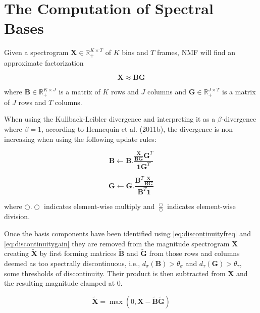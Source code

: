 \documentclass[10pt]{article}
\begin{document}
\section*{The Computation of Spectral Bases}
Given a spectrogram \( \mathbf{X} \in \mathbb{R}_{+}^{K \times T}\) of \( K \) bins and \( T \) frames, NMF
will find an approximate factorization

\[ \mathbf{X} \approx \mathbf{B}\mathbf{G} \]

\noindent
where \( \mathbf{B} \in \mathbb{R}_{+}^{K \times J}\) is a matrix of \( K \)
rows and \( J \) columns and \( \mathbf{G} \in \mathbb{R}_{+}^{J \times T}\) is
a matrix of \( J \) rows and \( T \) columns.
\par
When using the Kullback-Leibler divergence and interpreting it as a
\(\beta\)-divergence where \(\beta = 1 \), according to Hennequin et al.
(2011b), the divergence is non-increasing when using the following update rules:

\[ \mathbf{B} \gets
\mathbf{B}.\frac{\frac{\mathbf{X}}{\mathbf{B}\mathbf{G}}\mathbf{G}^T}
    {\mathbf{1}\mathbf{G}^T}
\]

\[ \mathbf{G} \gets
\mathbf{G}.\frac{\mathbf{B}^T\frac{\mathbf{X}}{\mathbf{B}\mathbf{G}}}
    {\mathbf{B}^{T}\mathbf{1}}
\]

\noindent
where \( \bigcirc.\bigcirc \) indicates element-wise multiply and \( \frac{\bigcirc}{\bigcirc} \) indicates
element-wise division.
\par
Once the basis components have been identified using
\eqref{eq:discontinuityfreq} and \eqref{eq:discontinuitygain} they are removed
from the magnitude spectrogram \( \mathbf{X} \) creating \( \tilde{\mathbf{X}} \) by
first forming matrices \( \tilde{\mathbf{B}} \) and \( \tilde{\mathbf{G}} \) from those rows and
columns deemed as too spectrally discontinuous, i.e., \( d_\sigma(\mathbf{B}) >
\theta_\sigma \) and \( d_\tau(\mathbf{G}) > \theta_\tau \), some thresholds of
discontinuity. Their product is then subtracted from \( \mathbf{X} \) and the
resulting magnitude clamped at 0.

\[
\mathbf{\tilde{X}} = \max(0,\mathbf{X} -
\mathbf{\tilde{B}}\mathbf{\tilde{G}})
\]
\end{document}
